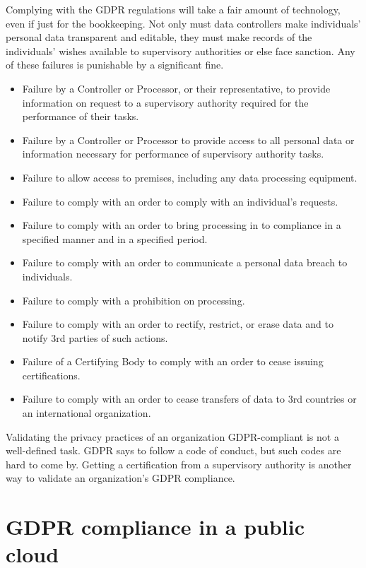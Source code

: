 Complying with the GDPR regulations will take a fair amount of technology, even if just for the bookkeeping.
Not only must data controllers make individuals’ personal data transparent and editable, they must make records of the individuals’ wishes available to supervisory authorities or else face sanction.
Any of these failures is punishable by a significant fine. \cite{gdpr}
\begin{itemize}
    \item Failure by a Controller or Processor, or their representative, to provide information on request to a supervisory authority required for the performance of their tasks.
    \item Failure by a Controller or Processor to provide access to all personal data or information necessary for performance of supervisory authority tasks.
    \item Failure to allow access to premises, including any data processing equipment.
    \item Failure to comply with an order to comply with an individual's requests.
    \item Failure to comply with an order to bring processing in to compliance in a specified manner and in a specified period.
    \item Failure to comply with an order to communicate a personal data breach to individuals.
    \item Failure to comply with a prohibition on processing.
    \item Failure to comply with an order to rectify, restrict, or erase data and to notify 3rd parties of such actions.
    \item Failure of a Certifying Body to comply with an order to cease issuing certifications.
    \item Failure to comply with an order to cease transfers of data to 3rd countries or an international organization.
\end{itemize}

Validating the privacy practices of an organization GDPR-compliant is not a well-defined task.
GDPR says to follow a code of conduct, but such codes are hard to come by.
Getting a certification from a supervisory authority is another way to validate an organization's GDPR compliance.
\cite{gdpr}

\section{GDPR compliance in a public cloud}

